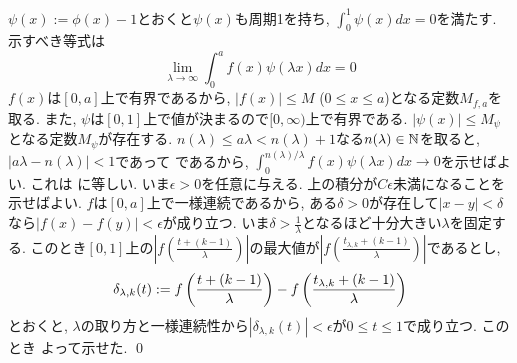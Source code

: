 \begin{egans}
$\psi(x):= \phi(x) - 1$とおくと$\psi(x)$も周期1を持ち, $\int_{0}^1 \psi(x) dx = 0$を満たす. 示すべき等式は
\[\lim_{\lambda\to \infty} \int_{0}^{a} f(x)\psi(\lambda x) dx = 0\]
$f(x)$は$[0,a]$上で有界であるから, $|f(x)|\leq M$ ($0\leq x\leq a$)となる定数$M_{f,a}$を取る. また, $\psi$は$[0,1]$上で値が決まるので$[0,\infty)$上で有界である. $|\psi(x)|\leq M_{\psi}$となる定数$M_{\psi}$が存在する. $n(\lambda) \leq a\lambda < n(\lambda) + 1$なる$n(\lambda)\in\mathbb{N}$を取ると, $|a\lambda-n(\lambda)| < 1$であって
であるから, $\int_{0}^{n(\lambda)/\lambda} f(x)\psi(\lambda x)dx \to 0$を示せばよい. これは
に等しい. いま$\epsilon > 0$を任意に与える. 上の積分が$C\epsilon$未満になることを示せばよい. $f$は$[0,a]$上で一様連続であるから, ある$\delta>0$が存在して$|x-y| < \delta$なら$|f(x) - f(y)|<\epsilon$が成り立つ. いま$\delta > \frac{1}{\lambda}$となるほど十分大きい$\lambda$を固定する. このとき$[0,1]$上の$|f(\frac{t+(k-1)}{\lambda})|$の最大値が$|f(\frac{t_{\lambda,k} + (k-1)}{\lambda})|$であるとし,
\[\delta_{\lambda,k}(t) := f\left( \dfrac{t+(k-1)}{\lambda} \right) - f\left( \dfrac{t_{\lambda,k} + (k-1)}{\lambda} \right)\]
とおくと, $\lambda$の取り方と一様連続性から$|\delta_{\lambda,k}(t)|<\epsilon$が$0\leq t\leq 1$で成り立つ. このとき
よって示せた. \qed
\end{egans}
